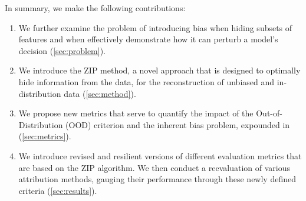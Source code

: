 \par \noindent
In summary, we make the following contributions:
\begin{enumerate}[itemsep=2pt, parsep=0pt, topsep=3pt]
	\item We further examine the problem of introducing bias when hiding subsets of features and when effectively demonstrate how it can perturb a model's decision (\autoref{sec:problem}).
	\item We introduce the ZIP method, a novel approach that is designed to optimally hide information from the data, for the reconstruction of unbiased and in-distribution data (\autoref{sec:method}). 
	\item We propose new metrics that serve to quantify the impact of the Out-of-Distribution (OOD) criterion and the inherent bias problem, expounded in (\autoref{sec:metrics}).
	\item We introduce revised and resilient versions of different evaluation metrics that are based on the ZIP algorithm. We then conduct a reevaluation of various attribution methods, gauging their performance through these newly defined criteria (\autoref{sec:results}).
\end{enumerate}

